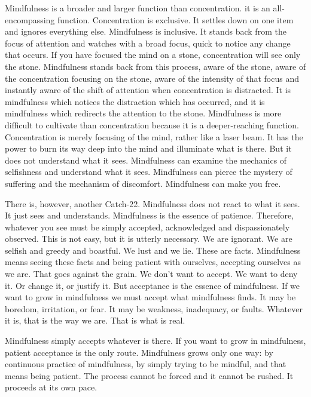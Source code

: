 Mindfulness is a broader and larger function than concentration. it is an
all-encompassing function. Concentration is exclusive. It settles down on one
item and ignores everything else. Mindfulness is inclusive. It stands back from
the focus of attention and watches with a broad focus, quick to notice any
change that occurs. If you have focused the mind on a stone, concentration will
see only the stone. Mindfulness stands back from this process, aware of the
stone, aware of the concentration focusing on the stone, aware of the intensity
of that focus and instantly aware of the shift of attention when concentration
is distracted. It is mindfulness which notices the distraction which has
occurred, and it is mindfulness which redirects the attention to the stone.
Mindfulness is more difficult to cultivate than concentration because it is a
deeper-reaching function. Concentration is merely focusing of the mind, rather
like a laser beam. It has the power to burn its way deep into the mind and
illuminate what is there. But it does not understand what it sees. Mindfulness
can examine the mechanics of selfishness and understand what it sees.
Mindfulness can pierce the mystery of suffering and the mechanism of discomfort.
Mindfulness can make you free.

There is, however, another Catch-22. Mindfulness does not react to what it sees.
It just sees and understands. Mindfulness is the essence of patience. Therefore,
whatever you see must be simply accepted, acknowledged and dispassionately
observed. This is not easy, but it is utterly necessary. We are ignorant. We are
selfish and greedy and boastful. We lust and we lie. These are facts.
Mindfulness means seeing these facts and being patient with ourselves, accepting
ourselves as we are. That goes against the grain.  We don't want to accept. We
want to deny it. Or change it, or justify it. But acceptance is the essence of
mindfulness. If we want to grow in mindfulness we must accept what mindfulness
finds. It may be boredom, irritation, or fear. It may be weakness, inadequacy,
or faults. Whatever it is, that is the way we are. That is what is real.

Mindfulness simply accepts whatever is there. If you want to grow in
mindfulness, patient acceptance is the only route.  Mindfulness grows only one
way: by continuous practice of mindfulness, by simply trying to be mindful, and
that means being patient. The process cannot be forced and it cannot be rushed.
It proceeds at its own pace.

